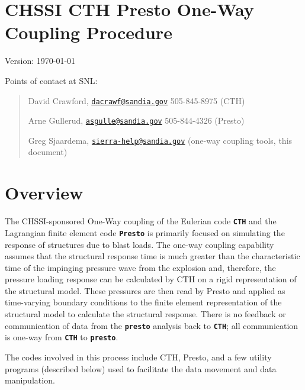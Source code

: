 \documentclass[11pt,twoside]{article}
\newcommand{\code}[1]
   {\mbox{\bf\tt #1}\null}
\begin{document}
\clearpage\pagestyle{Standard}
\section[CHSSI CTH Presto One{}-Way Coupling Procedure]{CHSSI CTH Presto
One{}-Way Coupling Procedure}
{Version: \centering \today}

Points of contact at SNL:
\begin{quote}
David Crawford,
\href{mailto:dacrawf@sandia.gov}{\nolinkurl{dacrawf@sandia.gov}}
505{}-845{}-8975  (CTH)

Arne Gullerud,
\href{mailto:asgulle@sandia.gov}{\nolinkurl{asgulle@sandia.gov}}
505{}-844{}-4326  (Presto)

Greg Sjaardema,
\href{mailto:sierra-help@sandia.gov}{\nolinkurl{sierra-help@sandia.gov}}
(one{}-way coupling tools, this document)
\end{quote}

\section{Overview}
The CHSSI-sponsored One{}-Way coupling of the Eulerian code \code{CTH}
and the Lagrangian finite element code \code{Presto} is primarily
focused on simulating the response of structures due to blast loads.
The one-way coupling capability assumes that the structural response
time is much greater than the characteristic time of the impinging
pressure wave from the explosion and, therefore, the pressure loading
response can be calculated by CTH on a rigid representation of the
structural model.  These pressures are then read by Presto and applied
as time-varying boundary conditions to the finite element
representation of the structural model to calculate the structural
response.  There is no feedback or communication of data from the
\code{presto} analysis back to \code{CTH}; all communication is
one{}-way from \code{CTH} to \code{presto}.

The codes involved in this process include CTH, Presto, and a few
utility programs (described below) used to facilitate the data
movement and data manipulation.
\end{document}

